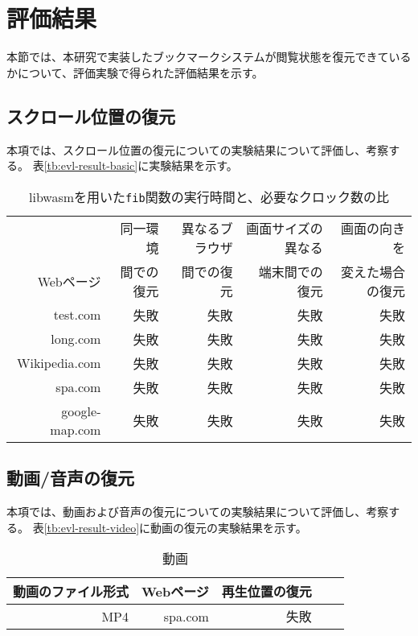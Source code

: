 \section{評価結果}
本節では、本研究で実装したブックマークシステムが閲覧状態を復元できているかについて、評価実験で得られた評価結果を示す。

\subsection{スクロール位置の復元}
本項では、スクロール位置の復元についての実験結果について評価し、考察する。
表\ref{tb:evl-result-basic}に実験結果を示す。

\begin{table}[htbp]
  \caption{libwasmを用いた{\tt fib}関数の実行時間と、必要なクロック数の比}
  \label{tab:evl-result-basic}
  \begin{center}
    \begin{tabular}{rrrrr}
      \hline
      & 同一環境 & 異なるブラウザ & 画面サイズの異なる &  画面の向きを \\
       Webページ & 間での復元 & 間での復元 & 端末間での復元 & 変えた場合の復元 \\ \hline \hline
      test.com & 失敗 & 失敗 &  失敗 & 失敗 \\ \hline
      long.com & 失敗 & 失敗 &  失敗 & 失敗 \\ \hline
      Wikipedia.com & 失敗 & 失敗 &  失敗 & 失敗 \\ \hline
      spa.com & 失敗 & 失敗 &  失敗 & 失敗 \\ \hline
      google-map.com & 失敗 & 失敗 &  失敗 & 失敗 \\ \hline
    \end{tabular}
  \end{center}
\end{table}

\subsection{動画/音声の復元}
本項では、動画および音声の復元についての実験結果について評価し、考察する。
表\ref{tb:evl-result-video}に動画の復元の実験結果を示す。

\begin{table}[htbp]
  \caption{動画}
  \label{tab:evl-result-video}
  \begin{center}
    \begin{tabular}{rrrrr}
      \hline
      動画のファイル形式 & Webページ & 再生位置の復元 \\ \hline \hline
      MP4 & spa.com & 失敗  \\ \hline
    \end{tabular}
  \end{center}
\end{table}

